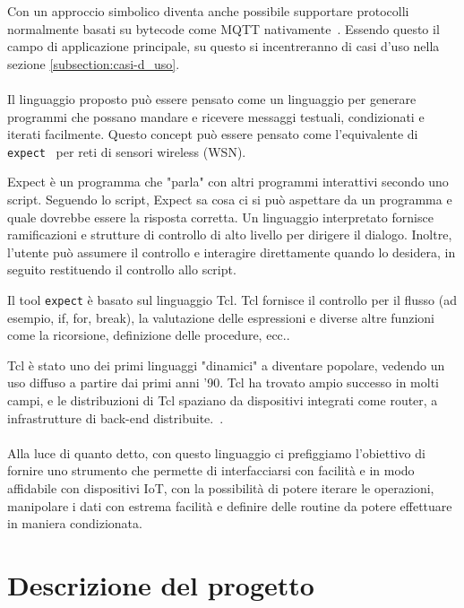 \documentclass[10pt]{article}
\begin{document}
Con un approccio simbolico diventa anche possibile supportare protocolli normalmente basati su bytecode come MQTT nativamente~\cite{gaglio19interoperable}.
Essendo questo il campo di applicazione principale, su questo si incentreranno di casi d'uso nella sezione \ref{subsection:casi-d_uso}.\\\\



Il linguaggio proposto può essere pensato come un linguaggio per generare programmi che possano mandare e ricevere messaggi testuali, condizionati e iterati facilmente. Questo concept può essere pensato come l'equivalente di \texttt{expect}~\cite{libes1991expect, libes1990expect, libes1995exploring} per reti di sensori wireless (WSN).

Expect è un programma che "parla" con altri programmi interattivi secondo uno script. Seguendo lo script, Expect sa cosa ci si può aspettare da un programma e quale dovrebbe essere la risposta corretta. Un linguaggio interpretato fornisce ramificazioni e strutture di controllo di alto livello per dirigere il dialogo. Inoltre, l'utente può assumere il controllo e interagire direttamente quando lo desidera, in seguito restituendo il controllo allo script.

Il tool \texttt{expect} è basato sul linguaggio Tcl. Tcl fornisce il controllo per il flusso (ad esempio, if, for, break), la valutazione delle espressioni e diverse altre funzioni come la ricorsione, definizione delle procedure, ecc.. 

Tcl è stato uno dei primi linguaggi "dinamici" a diventare popolare, vedendo un uso diffuso a partire dai primi anni '90. Tcl ha trovato ampio successo in molti campi, e le distribuzioni di Tcl spaziano da dispositivi integrati come router, a infrastrutture di back-end distribuite.~\cite{nadkarni2017tcl}.\\\\

Alla luce di quanto detto, con questo linguaggio ci prefiggiamo l'obiettivo di fornire uno strumento che permette di interfacciarsi con facilità e in modo affidabile con dispositivi IoT, con la possibilità di potere iterare le operazioni, manipolare i dati con estrema facilità e definire delle routine da potere effettuare in maniera condizionata.

\section{Descrizione del progetto}\label{section:descrizione}
\end{document}
